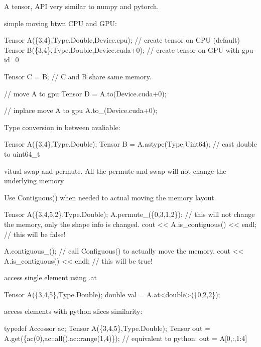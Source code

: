 \begin{DoxyItemize}
\item A tensor, A\+PI very similar to numpy and pytorch.
\item simple moving btwn C\+PU and G\+PU\+: 
\begin{DoxyCode}
Tensor A(\{3,4\},Type.Double,Device.cpu); \textcolor{comment}{// create tensor on CPU (default)}
Tensor B(\{3,4\},Type.Double,Device.cuda+0); \textcolor{comment}{// create tensor on GPU with gpu-id=0}


Tensor C = B; \textcolor{comment}{// C and B share same memory.}

\textcolor{comment}{// move A to gpu}
Tensor D = A.to(Device.cuda+0);

\textcolor{comment}{// inplace move A to gpu}
A.to\_(Device.cuda+0);
\end{DoxyCode}

\item Type conversion in between avaliable\+: 
\begin{DoxyCode}
Tensor A(\{3,4\},Type.Double);
Tensor B = A.astype(Type.Uint64); \textcolor{comment}{// cast double to uint64\_t}
\end{DoxyCode}

\item vitual swap and permute. All the permute and swap will not change the underlying memory
\item Use Contiguous() when needed to actual moving the memory layout. 
\begin{DoxyCode}
Tensor A(\{3,4,5,2\},Type.Double);
A.permute\_(\{0,3,1,2\}); \textcolor{comment}{// this will not change the memory, only the shape info is changed.}
cout << A.is\_contiguous() << endl; \textcolor{comment}{// this will be false!}

A.contiguous\_(); \textcolor{comment}{// call Configuous() to actually move the memory.}
cout << A.is\_contiguous() << endl; \textcolor{comment}{// this will be true!}
\end{DoxyCode}

\item access single element using .at 
\begin{DoxyCode}
Tensor A(\{3,4,5\},Type.Double);
\textcolor{keywordtype}{double} val = A.at<\textcolor{keywordtype}{double}>(\{0,2,2\});
\end{DoxyCode}

\item access elements with python slices similarity\+: 
\begin{DoxyCode}
\textcolor{keyword}{typedef} Accessor ac;
Tensor A(\{3,4,5\},Type.Double);
Tensor out = A.get(\{ac(0),ac::all(),ac::range(1,4)\}); 
\textcolor{comment}{// equivalent to python: out = A[0,:,1:4]    }
\end{DoxyCode}

\end{DoxyItemize}

